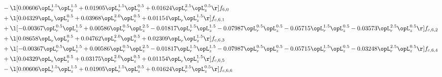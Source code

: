 \begin{alignat}{2}
& - \l[  0.00606 \opL_r^{1.5} \opL_z^{1.5} +  0.01905 \opL_r^{1.5} \opL_z^{0.5} +  0.01624 \opL_r^{2.5} \opL_z^{0.5}  \r] f_{6,0} \nonumber \\ 
& + \l[  0.04329 \opL_r \opL_z^{0.5} +  0.03968 \opL_r^{2.0} \opL_z^{0.5} +  0.01154 \opL_r \opL_z^{1.5}  \r] f_{c,6,1} \nonumber \\ 
& + \l[  -0.00367 \opL_r^{0.5} \opL_z^{1.5} +  0.00586 \opL_r^{0.5} \opL_z^{2.5}   -0.01817 \opL_r^{1.5} \opL_z^{1.5}   -0.07987 \opL_r^{0.5} \opL_z^{0.5}   -0.05715 \opL_r^{1.5} \opL_z^{0.5}   -0.03573 \opL_r^{2.5} \opL_z^{0.5}  \r] f_{c,6,2} \nonumber \\ 
& + \l[  0.08658 \opL_r \opL_z^{0.5} +  0.04762 \opL_r^{2.0} \opL_z^{0.5} +  0.02309 \opL_r \opL_z^{1.5}  \r] f_{c,6,3} \nonumber \\ 
& + \l[  -0.00367 \opL_r^{0.5} \opL_z^{1.5} +  0.00586 \opL_r^{0.5} \opL_z^{2.5}   -0.01817 \opL_r^{1.5} \opL_z^{1.5}   -0.07987 \opL_r^{0.5} \opL_z^{0.5}   -0.05715 \opL_r^{1.5} \opL_z^{0.5}   -0.03248 \opL_r^{2.5} \opL_z^{0.5}  \r] f_{c,6,4} \nonumber \\ 
& + \l[  0.04329 \opL_r \opL_z^{0.5} +  0.03175 \opL_r^{2.0} \opL_z^{0.5} +  0.01154 \opL_r \opL_z^{1.5}  \r] f_{c,6,5} \nonumber \\ 
& - \l[  0.00606 \opL_r^{1.5} \opL_z^{1.5} +  0.01905 \opL_r^{1.5} \opL_z^{0.5} +  0.01624 \opL_r^{2.5} \opL_z^{0.5}  \r] f_{c,6,6} \nonumber \\ 
\end{alignat} 


